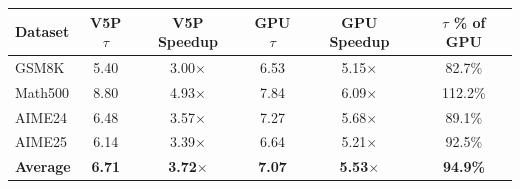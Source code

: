\centering
\begin{tabular}{l|cc|cc|c}
\toprule
Dataset & V5P $\tau$ & V5P Speedup & GPU $\tau$ & GPU Speedup & $\tau$ \% of GPU \\
\midrule
GSM8K & 5.40 & 3.00$\times$ & 6.53 & 5.15$\times$ & 82.7\% \\
Math500 & 8.80 & 4.93$\times$ & 7.84 & 6.09$\times$ & 112.2\% \\
AIME24 & 6.48 & 3.57$\times$ & 7.27 & 5.68$\times$ & 89.1\% \\
AIME25 & 6.14 & 3.39$\times$ & 6.64 & 5.21$\times$ & 92.5\% \\
\midrule
\textbf{Average} & \textbf{6.71} & \textbf{3.72}$\times$ & \textbf{7.07} & \textbf{5.53}$\times$ & \textbf{94.9\%} \\
\bottomrule
\end{tabular}
